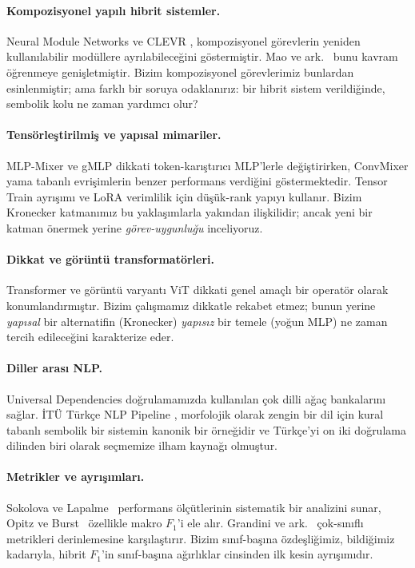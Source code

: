 \documentclass[11pt,a4paper]{article}
\begin{document}
\paragraph{Kompozisyonel yapılı hibrit sistemler.}
Neural Module Networks \cite{andreas2016neural} ve CLEVR
\cite{johnson2017clevr}, kompozisyonel görevlerin yeniden
kullanılabilir modüllere ayrılabileceğini göstermiştir. Mao ve
ark.~\cite{mao2019neuro} bunu kavram öğrenmeye genişletmiştir.
Bizim kompozisyonel görevlerimiz bunlardan esinlenmiştir; ama farklı
bir soruya odaklanırız: bir hibrit sistem verildiğinde, sembolik
kolu ne zaman yardımcı olur?

\paragraph{Tensörleştirilmiş ve yapısal mimariler.}
MLP-Mixer \cite{tolstikhin2021mlp} ve gMLP \cite{liu2021gmlp}
dikkati token-karıştırıcı MLP'lerle değiştirirken, ConvMixer
\cite{trockman2023patches} yama tabanlı evrişimlerin benzer performans
verdiğini göstermektedir. Tensor Train ayrışımı
\cite{novikov2015tensor} ve LoRA \cite{hu2021lora} verimlilik için
düşük-rank yapıyı kullanır. Bizim Kronecker katmanımız bu
yaklaşımlarla yakından ilişkilidir; ancak yeni bir katman önermek
yerine \emph{görev-uygunluğu} inceliyoruz.

\paragraph{Dikkat ve görüntü transformatörleri.}
Transformer \cite{vaswani2017attention} ve görüntü varyantı ViT
\cite{dosovitskiy2020vit} dikkati genel amaçlı bir operatör olarak
konumlandırmıştır. Bizim çalışmamız dikkatle rekabet etmez; bunun
yerine \emph{yapısal} bir alternatifin (Kronecker) \emph{yapısız}
bir temele (yoğun MLP) ne zaman tercih edileceğini karakterize eder.

\paragraph{Diller arası NLP.}
Universal Dependencies \cite{nivre2020ud} doğrulamamızda kullanılan
çok dilli ağaç bankalarını sağlar. İTÜ Türkçe NLP Pipeline
\cite{eryigit2015itu}, morfolojik olarak zengin bir dil için kural
tabanlı sembolik bir sistemin kanonik bir örneğidir ve Türkçe'yi
on iki doğrulama dilinden biri olarak seçmemize ilham kaynağı olmuştur.

\paragraph{Metrikler ve ayrışımları.}
Sokolova ve Lapalme~\cite{sokolova2009systematic} performans
ölçütlerinin sistematik bir analizini sunar, Opitz ve
Burst~\cite{opitz2019macro} özellikle makro $F_1$'i ele alır.
Grandini ve ark.~\cite{grandini2020metrics} çok-sınıflı metrikleri
derinlemesine karşılaştırır. Bizim sınıf-başına özdeşliğimiz,
bildiğimiz kadarıyla, hibrit $F_1$'in sınıf-başına ağırlıklar
cinsinden ilk kesin ayrışımıdır.
\end{document}
